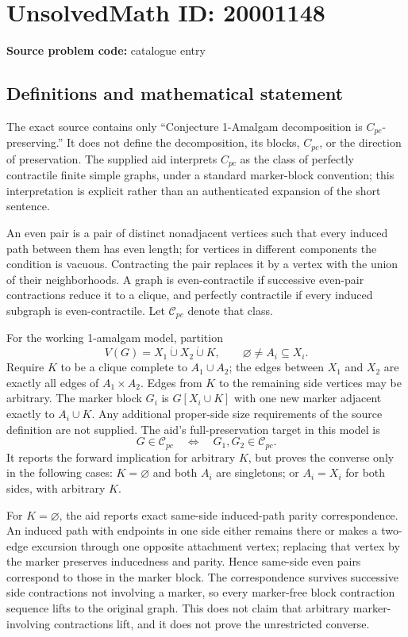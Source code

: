 \documentclass[11pt]{article}
\begin{document}
\section*{UnsolvedMath ID: 20001148}
\textbf{Source problem code:} catalogue entry
\subsection{Definitions and mathematical statement}
The exact source contains only ``Conjecture 1-Amalgam decomposition is \(C_{pc}\)-preserving.'' It does not define the decomposition, its blocks, \(C_{pc}\), or the direction of preservation. The supplied aid interprets \(C_{pc}\) as the class of perfectly contractile finite simple graphs, under a standard marker-block convention; this interpretation is explicit rather than an authenticated expansion of the short sentence.

An even pair is a pair of distinct nonadjacent vertices such that every induced path between them has even length; for vertices in different components the condition is vacuous. Contracting the pair replaces it by a vertex with the union of their neighborhoods. A graph is even-contractile if successive even-pair contractions reduce it to a clique, and perfectly contractile if every induced subgraph is even-contractile. Let \(\mathcal C_{pc}\) denote that class.

For the working 1-amalgam model, partition
\[
 V(G)=X_1\mathbin{\dot\cup}X_2\mathbin{\dot\cup}K,
 \qquad\varnothing\ne A_i\subseteq X_i.
\]
Require \(K\) to be a clique complete to \(A_1\cup A_2\); the edges between \(X_1\) and \(X_2\) are exactly all edges of \(A_1\times A_2\). Edges from \(K\) to the remaining side vertices may be arbitrary. The marker block \(G_i\) is \(G[X_i\cup K]\) with one new marker adjacent exactly to \(A_i\cup K\). Any additional proper-side size requirements of the source definition are not supplied. The aid's full-preservation target in this model is
\[
 G\in\mathcal C_{pc}\quad\Longleftrightarrow\quad
 G_1,G_2\in\mathcal C_{pc}.
\]
It reports the forward implication for arbitrary \(K\), but proves the converse only in the following cases: \(K=\varnothing\) and both \(A_i\) are singletons; or \(A_i=X_i\) for both sides, with arbitrary \(K\).

For \(K=\varnothing\), the aid reports exact same-side induced-path parity correspondence. An induced path with endpoints in one side either remains there or makes a two-edge excursion through one opposite attachment vertex; replacing that vertex by the marker preserves inducedness and parity. Hence same-side even pairs correspond to those in the marker block. The correspondence survives successive side contractions not involving a marker, so every marker-free block contraction sequence lifts to the original graph. This does not claim that arbitrary marker-involving contractions lift, and it does not prove the unrestricted converse.
\end{document}

